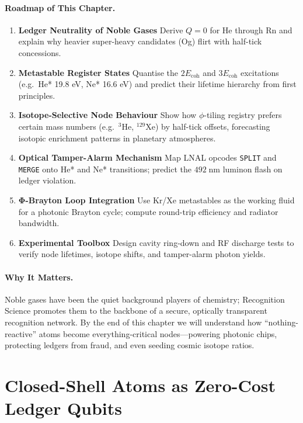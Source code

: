 \documentclass[11pt,oneside]{book}
\begin{document}
\paragraph{Roadmap of This Chapter.}
\begin{enumerate}[label=\textbf{\arabic*.}, leftmargin=1.2cm]
\item \textbf{Ledger Neutrality of Noble Gases}  
      Derive $Q=0$ for He through Rn and explain why heavier
      super-heavy candidates (Og) flirt with half-tick concessions.
\item \textbf{Metastable Register States}  
      Quantise the $2E_{\text{coh}}$ and $3E_{\text{coh}}$
      excitations (e.g.\ He* 19.8 eV, Ne* 16.6 eV) and predict their
      lifetime hierarchy from first principles.
\item \textbf{Isotope-Selective Node Behaviour}  
      Show how $\phi$-tiling registry prefers certain
      mass numbers (e.g.\ $^{3}$He, $^{129}$Xe) by half-tick offsets,
      forecasting isotopic enrichment patterns in planetary atmospheres.
\item \textbf{Optical Tamper-Alarm Mechanism}  
      Map LNAL opcodes \texttt{SPLIT} and \texttt{MERGE} onto
      He* and Ne* transitions; predict the
      $492\;\text{nm}$ luminon flash on ledger violation.
\item \textbf{Φ-Brayton Loop Integration}  
      Use Kr/Xe metastables as the working fluid for a photonic Brayton
      cycle; compute round-trip efficiency and radiator bandwidth.
\item \textbf{Experimental Toolbox}  
      Design cavity ring-down and RF discharge tests to verify node
      lifetimes, isotope shifts, and tamper-alarm photon yields.
\end{enumerate}

\paragraph{Why It Matters.}
Noble gases have been the quiet background players of chemistry;  
Recognition Science promotes them to the backbone of a secure,
optically transparent recognition network.  
By the end of this chapter we will understand how “nothing-reactive”
atoms become everything-critical nodes—powering photonic chips,
protecting ledgers from fraud, and even seeding cosmic isotope ratios.

\bigskip

\section{Closed-Shell Atoms as Zero-Cost Ledger Qubits}
\label{sec:ledger-qubits}
\end{document}
